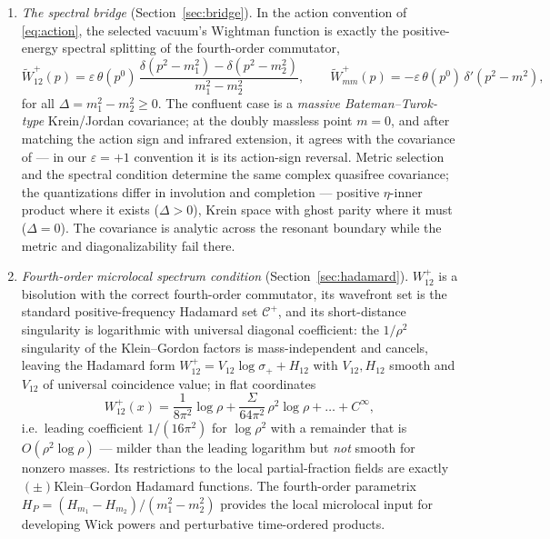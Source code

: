 \documentclass[11pt]{article}
\theoremstyle{definition}
\theoremstyle{remark}
\begin{document}
\begin{enumerate}
\item \emph{The spectral bridge} (Section~\ref{sec:bridge}).  In the
action convention of \eqref{eq:action}, the selected vacuum's Wightman
function is exactly the positive-energy spectral splitting of the
fourth-order commutator,
\begin{equation}\label{eq:Wspectral}
\widetilde W^+_{12}(p)
=\varepsilon\,\theta(p^0)\,
\frac{\delta(p^2-m_1^2)-\delta(p^2-m_2^2)}{m_1^2-m_2^2},
\qquad
\widetilde W^+_{mm}(p)=-\varepsilon\,\theta(p^0)\,\delta'(p^2-m^2),
\end{equation}
for all $\Delta=m_1^2-m_2^2\ge0$.  The confluent case is a
\emph{massive Bateman--Turok-type} Krein/Jordan covariance; at the
doubly massless point $m=0$, and after matching the action sign and
infrared extension, it agrees with the covariance of \cite{BT2026} ---
in our $\varepsilon=+1$ convention it is its action-sign reversal.
Metric selection and the spectral condition determine the same complex
quasifree covariance; the quantizations differ in involution and
completion --- positive $\eta$-inner product where it exists
($\Delta>0$), Krein space with ghost parity where it must ($\Delta=0$).
The covariance is analytic across the resonant boundary while the metric
and diagonalizability fail there.

\item \emph{Fourth-order microlocal spectrum condition}
(Section~\ref{sec:hadamard}).
$W^+_{12}$ is a bisolution with the correct fourth-order commutator, its
wavefront set is the standard positive-frequency Hadamard set
$\mathcal C^+$, and its short-distance singularity is logarithmic with
universal diagonal coefficient: the $1/\rho^2$ singularity of the
Klein--Gordon factors is mass-independent and cancels, leaving the
Hadamard form $W^+_{12}=V_{12}\log\sigma_++H_{12}$ with $V_{12},H_{12}$
smooth and $V_{12}$ of universal coincidence value; in flat coordinates
\begin{equation}
W^+_{12}(x)=\frac{1}{8\pi^2}\log\rho
+\frac{\Sigma}{64\pi^2}\,\rho^2\log\rho+\dots+C^\infty,
\end{equation}
i.e.\ leading coefficient $1/(16\pi^2)$ for $\log\rho^2$ with a
remainder that is $O(\rho^2\log\rho)$ --- milder than the leading
logarithm but \emph{not} smooth for nonzero masses.  Its restrictions to
the local partial-fraction fields are exactly $(\pm)$Klein--Gordon
Hadamard functions.  The fourth-order parametrix
$H_P=(H_{m_1}-H_{m_2})/(m_1^2-m_2^2)$ provides the local microlocal
input for developing Wick powers and perturbative time-ordered products.
\end{enumerate}
\end{document}
